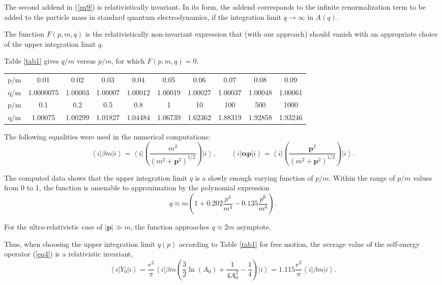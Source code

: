 \documentclass[a4paper,draft,showpacs,preprint,prd,aps]{revtex4}
\begin{document}
The second addend in (\ref{eq9}) is relativistically invariant. In its form,
the
addend corresponds to the infinite renormalization term to be added to the
particle mass in standard quantum electrodynamics, if the integration limit
$q \to \infty $ in $A(q)$.

The function $F(p,m,q)$ is the relativistically non-invariant
expression that (with our approach) should vanish with an appropriate choice
of the upper integration limit $q$.

Table \ref{tab1} gives $q/m$ versus $p/m$, for which
$F(p,m,q)=0$.

\begin{table*}[h]
\caption{The upper integration limit $q(p)$}
\label{tab1}
\begin{ruledtabular}
\begin{tabular}{cccccccccc}
p/m& 0.01& 0.02& 0.03& 0.04& 0.05& 0.06& 0.07& 0.08& 0.09 \\
q/m& 1.0000075& 1.00003& 1.00007& 1.00012& 1.00019& 1.00027& 1.00037&
1.00048& 1.00061\\
\hline
p/m& 0.1& 0.2& 0.5& 0.8& 1& 10& 100& 500& 1000  \\
q/m& 1.00075& 1.00299& 1.01827& 1.04484& 1.06739& 1.62362& 1.88319&
1.92858& 1.93246
\end{tabular}
\end{ruledtabular}
\end{table*}

The following equalities were used in the numerical computations:
\[
\left\langle i \right|\beta m \left| i \right\rangle =
\left\langle i \right|\left( \frac{m^2}{(m^2 + \bm{p}^2)^{1/2}}\right)
\left| i \right\rangle,\qquad
\left\langle i \right| \bm{\alpha}\bm{p}\left| i \right\rangle =
\left\langle i \right|\left( \frac{\bm{p}^2}{(m^2 + \bm{p}^2)^{1/2}}\right)
\left| i \right\rangle.
\]

The computed data shows that the upper integration limit $q$ is a
slowly enough varying function of $p/m$. Within the range of
$p/m$ values from 0 to 1, the function is amenable to
approximation by the polynomial expression
\begin{equation}
\label{eq10}
q \approx m\left(1 + 0.202\frac{p^4}{m^4} -
0.135\frac{p^6}{m^6}\right).
\end{equation}

For the ultra-relativistic case of $|\bm{p}|\gg m$, the function approaches
$q \approx 2m$ asymptote.

Thus, when choosing the upper integration limit $q(p)$ according
to Table \ref{tab1} for free motion, the average
value of the self-energy operator (\ref{eq4}) is a relativistic invariant,
\begin{equation}
\label{eq11}
\left\langle i\right|Y_0 \left| i \right\rangle =
\frac {e^2}\pi
\left\langle i \right| \beta m \left( \frac 32\ln(A_0) +
\frac 1{4A_0^2} - \frac 14\right)
\left| i \right\rangle = 1.115\frac{e^2}\pi
\left\langle i \right|\beta m\left| i \right\rangle.
\end{equation}
\end{document}
